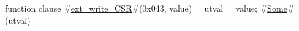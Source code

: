 function clause #\hyperref[sailRISCVzextzywritezyCSR]{ext\_write\_CSR}#(0x043, value) = { utval = value; #\hyperref[sailRISCVzSome]{Some}#(utval) }
